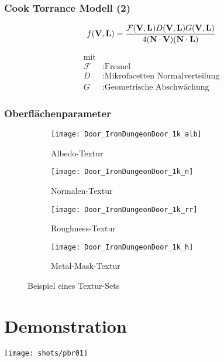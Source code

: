\begin{frame}
  \frametitle{Cook Torrance Modell (2)}
  \begin{Definition}

    \begin{align*}
    	f(\mathbf V,\mathbf L) = \frac{\mathcal{F}(\mathbf V,\mathbf L)D(\mathbf V,\mathbf L)G(\mathbf V,\mathbf L)}{4(\mathbf N \cdot \mathbf V)(\mathbf N \cdot \mathbf L)}
    \end{align*}

    \begin{align*}
      \text{mit}\\
      \mathcal{F} &: \text{Fresnel} \\
    	D  &: \text{Mikrofacetten Normalverteilung} \\
    	G  &: \text{Geometrische Abschwächung}
    \end{align*}

  \end{Definition}
\end{frame}

\begin{frame}
  \frametitle{Oberflächenparameter}

  \begin{figure}
    \centering
    \begin{subfigure}{0.24\textwidth}
    	\texttt{[image: Door\_IronDungeonDoor\_1k\_alb]}
    	\caption{Albedo-Textur}
    \end{subfigure}
    \begin{subfigure}{0.24\textwidth}
    	\texttt{[image: Door\_IronDungeonDoor\_1k\_n]}
    	\caption{Normalen-Textur}
    \end{subfigure}
    \begin{subfigure}{0.24\textwidth}
    	\texttt{[image: Door\_IronDungeonDoor\_1k\_rr]}
    	\caption{Roughness-Textur}
    \end{subfigure}
    \begin{subfigure}{0.24\textwidth}
    	\texttt{[image: Door\_IronDungeonDoor\_1k\_h]}
    	\caption{Metal-Mask-Textur}
    \end{subfigure}
    \caption{Beispiel eines Textur-Sets}
  \end{figure}

\end{frame}


\section{Demonstration}
\begin{frame}
  \sectionpage
  \centering
  \texttt{[image: shots/pbr01]}
\end{frame}

